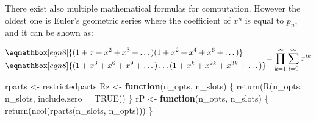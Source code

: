 \documentclass[
  letterpaper,
]{article}
\newenvironment{Shaded}{\begin{snugshade}}{\end{snugshade}}
\newcommand{\AttributeTok}[1]{\textcolor[rgb]{0.40,0.45,0.13}{#1}}
\newcommand{\ConstantTok}[1]{\textcolor[rgb]{0.56,0.35,0.01}{#1}}
\newcommand{\ControlFlowTok}[1]{\textcolor[rgb]{0.00,0.23,0.31}{\textbf{#1}}}
\newcommand{\FunctionTok}[1]{\textcolor[rgb]{0.28,0.35,0.67}{#1}}
\newcommand{\NormalTok}[1]{\textcolor[rgb]{0.00,0.23,0.31}{#1}}
\newcommand{\OtherTok}[1]{\textcolor[rgb]{0.00,0.23,0.31}{#1}}
\begin{document}
There exist also multiple mathematical formulas for computation. However
the oldest one is Euler's geometric series where the coefficient of
\(x^n\) is equal to \(p_n\), and it can be shown as:

\small

\begin{equation}
\begin{aligned}
    & \eqmathbox[eqn8]{(1+x+x^2+x^3+\dots)(1+x^2+x^4+x^6+\dots)} \\
    & \eqmathbox[eqn8]{(1+x^3+x^6+x^9+\dots)\dots(1+x^k+x^{2k}+x^{3k}+\dots)}
\end{aligned}
\begin{aligned}
    = \prod_{k=1}^{\infty}\sum_{i=0}^{\infty} x^{ik}
\end{aligned}
\end{equation} \normalsize \vspace{0.25cm}

\begin{Shaded}
\begin{Highlighting}[]
\NormalTok{rparts }\OtherTok{\textless{}{-}}\NormalTok{ restrictedparts}
\NormalTok{Rz }\OtherTok{\textless{}{-}} \ControlFlowTok{function}\NormalTok{(n\_opts, n\_slots) \{}
  \FunctionTok{return}\NormalTok{(}\FunctionTok{R}\NormalTok{(n\_opts, n\_slots, }\AttributeTok{include.zero =} \ConstantTok{TRUE}\NormalTok{))}
\NormalTok{\}}
\NormalTok{rP }\OtherTok{\textless{}{-}} \ControlFlowTok{function}\NormalTok{(n\_opts, n\_slots) \{}
  \FunctionTok{return}\NormalTok{(}\FunctionTok{ncol}\NormalTok{(}\FunctionTok{rparts}\NormalTok{(n\_slots, n\_opts)))}
\NormalTok{\}}
\end{Highlighting}
\end{Shaded}

\vspace{0.33cm}
\end{document}
